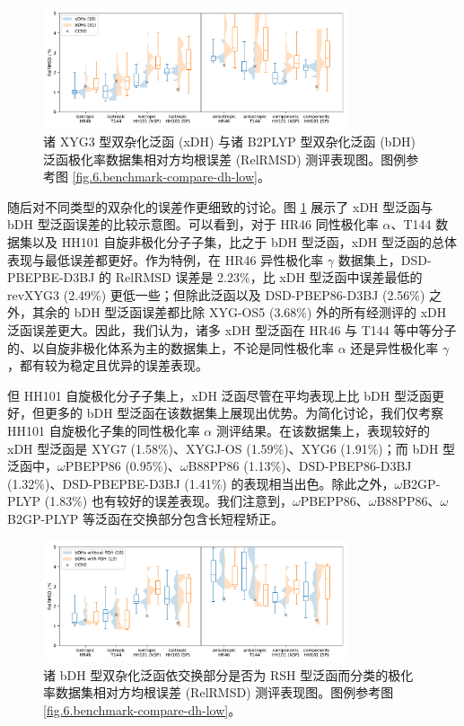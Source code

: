 \begin{figure}[hp]
    \centering
    \caption{诸 XYG3 型双杂化泛函 (xDH) 与诸 B2PLYP 型双杂化泛函 (bDH) 泛函极化率数据集相对方均根误差 (RelRMSD) 测评表现图。图例参考图 \ref{fig.6.benchmark-compare-dh-low}。}
    \label{fig.6.benchmark-compare-xdh-bdh}
    \includegraphics[width=0.8\textwidth]{assets/benchmark-compare-xdh-bdh.pdf}
\end{figure}

随后对不同类型的双杂化的误差作更细致的讨论。图 \ref{fig.6.benchmark-compare-xdh-bdh} 展示了 xDH 型泛函与 bDH 型泛函误差的比较示意图。可以看到，对于 HR46 同性极化率 $\alpha$、T144 数据集以及 HH101 自旋非极化分子子集，比之于 bDH 型泛函，xDH 型泛函的总体表现与最低误差都更好。作为特例，在 HR46 异性极化率 $\gamma$ 数据集上，DSD-PBEPBE-D3BJ 的 RelRMSD 误差是 2.23\%，比 xDH 型泛函中误差最低的 revXYG3 (2.49\%) 更低一些；但除此泛函以及 DSD-PBEP86-D3BJ (2.56\%) 之外，其余的 bDH 型泛函误差都比除 XYG-OS5 (3.68\%) 外的所有经测评的 xDH 泛函误差更大。因此，我们认为，诸多 xDH 型泛函在 HR46 与 T144 等中等分子的、以自旋非极化体系为主的数据集上，不论是同性极化率 $\alpha$ 还是异性极化率 $\gamma$，都有较为稳定且优异的误差表现。

但 HH101 自旋极化分子子集上，xDH 泛函尽管在平均表现上比 bDH 型泛函更好，但更多的 bDH 型泛函在该数据集上展现出优势。为简化讨论，我们仅考察 HH101 自旋极化子集的同性极化率 $\alpha$ 测评结果。在该数据集上，表现较好的 xDH 型泛函是 XYG7 (1.58\%)、XYGJ-OS (1.59\%)、XYG6 (1.91\%)；而 bDH 型泛函中，$\omega$PBEPP86 (0.95\%)、$\omega$B88PP86 (1.13\%)、DSD-PBEP86-D3BJ (1.32\%)、DSD-PBEPBE-D3BJ (1.41\%) 的表现相当出色。除此之外，$\omega$B2GP-PLYP (1.83\%) 也有较好的误差表现。我们注意到，$\omega$PBEPP86、$\omega$B88PP86、$\omega$B2GP-PLYP 等泛函在交换部分包含长短程矫正。

\begin{figure}[hp]
    \centering
    \caption{诸 bDH 型双杂化泛函依交换部分是否为 RSH 型泛函而分类的极化率数据集相对方均根误差 (RelRMSD) 测评表现图。图例参考图 \ref{fig.6.benchmark-compare-dh-low}。}
    \label{fig.6.benchmark-compare-dh-rsh}
    \includegraphics[width=0.8\textwidth]{assets/benchmark-compare-dh-rsh.pdf}
\end{figure}


